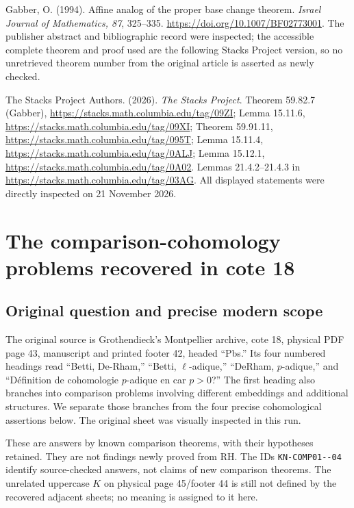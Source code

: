 \documentclass[11pt,a4paper]{article}
\theoremstyle{definition}\newtheorem{definition}[theorem]{Definition}
\theoremstyle{remark}\newtheorem{remark}[theorem]{Remark}
\begin{document}
Gabber, O. (1994). Affine analog of the proper base change theorem.
\emph{Israel Journal of Mathematics, 87}, 325--335.
\url{https://doi.org/10.1007/BF02773001}.
The publisher abstract and bibliographic record were inspected;
the accessible complete theorem and proof used are the following
Stacks Project version, so no unretrieved theorem number from the
original article is asserted as newly checked.

The Stacks Project Authors. (2026). \emph{The Stacks Project}.
Theorem 59.82.7 (Gabber), \url{https://stacks.math.columbia.edu/tag/09ZI};
Lemma 15.11.6, \url{https://stacks.math.columbia.edu/tag/09XI};
Theorem 59.91.11, \url{https://stacks.math.columbia.edu/tag/095T};
Lemma 15.11.4, \url{https://stacks.math.columbia.edu/tag/0ALJ};
Lemma 15.12.1, \url{https://stacks.math.columbia.edu/tag/0A02}.
Lemmas 21.4.2--21.4.3 in \url{https://stacks.math.columbia.edu/tag/03AG}.
All displayed statements were directly inspected on 21 November 2026.


\section{The comparison-cohomology problems recovered in cote 18}

\subsection{Original question and precise modern scope}
The original source is Grothendieck's Montpellier archive, cote 18,
physical PDF page 43, manuscript and printed footer 42, headed
``Pbs.''  Its four numbered headings read ``Betti, De-Rham,''
``Betti, $\ell$-adique,'' ``DeRham, $p$-adique,'' and
``D\'efinition de cohomologie $p$-adique en car $p>0$?''
The first heading also branches into comparison problems involving
different embeddings and additional structures.  We separate those
branches from the four precise cohomological assertions below.
The original sheet was visually inspected in this run.

These are answers by known comparison theorems, with their hypotheses
retained.  They are not findings newly proved from RH.  The IDs
\nolinkurl{KN-COMP01--04} identify source-checked answers, not claims of
new comparison theorems.  The unrelated uppercase $K$ on physical
page 45/footer 44 is still not defined by the recovered adjacent
sheets; no meaning is assigned to it here.
\end{document}
